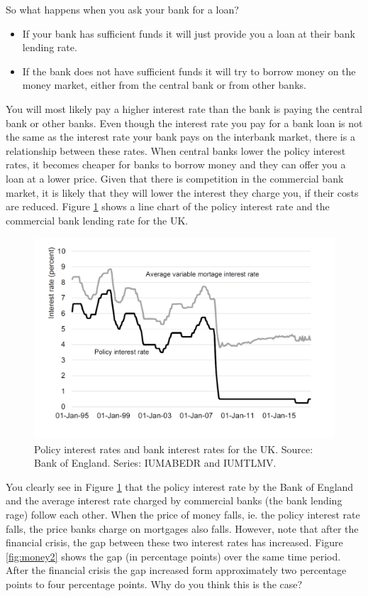 \documentclass[]{book}
\providecommand{\tightlist}{%
  \setlength{\itemsep}{0pt}\setlength{\parskip}{0pt}}
\begin{document}
So what happens when you ask your bank for a loan?

\begin{itemize}
\tightlist
\item
  If your bank has sufficient funds it will just provide you a loan at their bank lending rate.
\item
  If the bank does not have sufficient funds it will try to borrow money on the money market, either from the central bank or from other banks.
\end{itemize}

You will most likely pay a higher interest rate than the bank is paying the central bank or other banks. Even though the interest rate you pay for a bank loan is not the same as the interest rate your bank pays on the interbank market, there is a relationship between these rates. When central banks lower the policy interest rates, it becomes cheaper for banks to borrow money and they can offer you a loan at a lower price. Given that there is competition in the commercial bank market, it is likely that they will lower the interest they charge you, if their costs are reduced. Figure \ref{fig:money1} shows a line chart of the policy interest rate and the commercial bank lending rate for the UK.

\begin{figure}

{\centering \includegraphics[width=0.7\linewidth]{_resources/chapter_money/ex4_2} 

}

\caption{Policy interest rates and bank interest rates for the UK. Source: Bank of England. Series: IUMABEDR and IUMTLMV.}\label{fig:money1}
\end{figure}

You clearly see in Figure \ref{fig:money1} that the policy interest rate by the Bank of England and the average interest rate charged by commercial banks (the bank lending rage) follow each other. When the price of money falls, ie. the policy interest rate falls, the price banks charge on mortgages also falls. However, note that after the financial crisis, the gap between these two interest rates has increased. Figure \ref{fig:money2} shows the gap (in percentage points) over the same time period. After the financial crisis the gap increased form approximately two percentage points to four percentage points. Why do you think this is the case?
\end{document}
